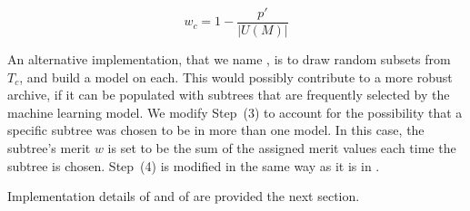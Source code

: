 
\begin{equation}
\label{eq:subtree_contrib}
w_c = 1 - \frac{p'}{|U(M)|}
\end{equation}

An alternative implementation, that we name \DRAW,  is to draw random subsets from $T_{c}$, and build a model on each.  This would possibly contribute to a more robust archive, if it can be populated with subtrees that are frequently selected by the machine learning model.  We modify Step~(3) to account for the possibility that a specific subtree was chosen to be in more than one model.  In this case, the subtree's merit $w$ is set to be the sum of the assigned merit values each time the subtree is chosen.  Step~(4) is modified in the same way as it is in \FULL.

Implementation details of \FULL and of \DRAW are provided the next section.  


